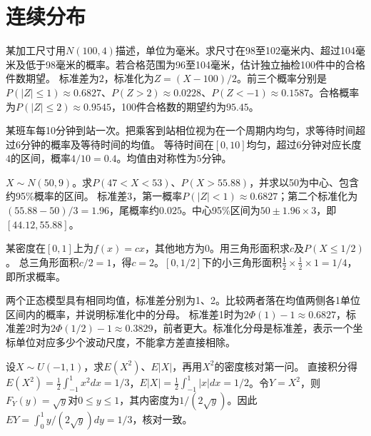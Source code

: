 \par\addvspace{12pt}

\section{连续分布}

某加工尺寸用\(N(100,4)\)描述，单位为毫米。求尺寸在98至102毫米内、超过104毫米及低于98毫米的概率。若合格范围为96至104毫米，估计独立抽检100件中的合格件数期望。
\solutionanswer
标准差为\(2\)，标准化为\(Z=(X-100)/2\)。前三个概率分别是\(P(|Z|\le1)\approx0.6827\)、\(P(Z>2)\approx0.0228\)、\(P(Z<-1)\approx0.1587\)。合格概率为\(P(|Z|\le2)\approx0.9545\)，100件合格数的期望约为\(95.45\)。


某班车每10分钟到站一次。把乘客到站相位视为在一个周期内均匀，求等待时间超过6分钟的概率及等待时间的均值。
\solutionanswer
等待时间在\([0,10]\)均匀，超过6分钟对应长度\(4\)的区间，概率\(4/10=0.4\)。均值由对称性为\(5\)分钟。


\(X\sim N(50,9)\)。求\(P(47<X<53)\)、\(P(X>55.88)\)，并求以50为中心、包含约95\%概率的区间。
\solutionanswer
标准差\(3\)，第一概率\(P(|Z|<1)\approx0.6827\)；第二个标准化为\((55.88-50)/3=1.96\)，尾概率约\(0.025\)。中心95\%区间为\(50\pm1.96\times3\)，即\([44.12,55.88]\)。


某密度在\([0,1]\)上为\(f(x)=cx\)，其他地方为0。用三角形面积求\(c\)及\(P(X\le1/2)\)。
\solutionanswer
总三角形面积\(c/2=1\)，得\(c=2\)。\([0,1/2]\)下的小三角形面积\(\tfrac12\times\tfrac12\times1=1/4\)，即所求概率。


两个正态模型具有相同均值，标准差分别为1、2。比较两者落在均值两侧各1单位区间内的概率，并说明标准化中的分母。
\solutionanswer
标准差1时为\(2\Phi(1)-1\approx0.6827\)，标准差2时为\(2\Phi(1/2)-1\approx0.3829\)，前者更大。标准化分母是标准差，表示一个坐标单位对应多少个波动尺度，不能拿方差直接相除。


设\(X\sim U(-1,1)\)，求\(E(X^2)\)、\(E|X|\)，再用\(X^2\)的密度核对第一问。
\solutionanswer
直接积分得\(E(X^2)=\frac12\int_{-1}^1x^2dx=1/3\)，\(E|X|=\frac12\int_{-1}^1|x|dx=1/2\)。令\(Y=X^2\)，则\(F_Y(y)=\sqrt y\)对\(0\le y\le1\)，其内密度为\(1/(2\sqrt y)\)。因此\(EY=\int_0^1y/(2\sqrt y)dy=1/3\)，核对一致。


